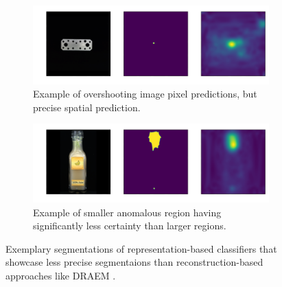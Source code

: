 \begin{figure}[H]
    \captionsetup[subfigure]{justification=centering}
    \centering
    \begin{subfigure}[b]{0.45\textwidth}
        \centering
        \includegraphics[width=\textwidth]{figures/overshootexamples/flat_connector_test_logical_anomalies_004.png}
        \caption{Example of overshooting image pixel predictions, but precise spatial prediction.}

    \end{subfigure}
    \begin{subfigure}[b]{0.45\textwidth}
        \centering
        \includegraphics[width=\textwidth]{figures/overshootexamples/juice_bottle_test_structural_anomalies_019.png}
        \caption{Example of smaller anomalous region having significantly less certainty than larger regions.}

    \end{subfigure}
    
    \caption{Exemplary segmentations of representation-based classifiers that showcase less precise segmentaions than reconstruction-based approaches like DRAEM \cite{Zavrtanik_2021DRAEM}.}
    \label{fig:overshoot}
\end{figure}